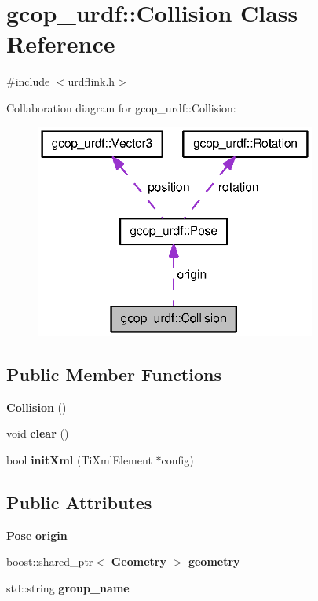 \section{gcop\-\_\-urdf\-:\-:\-Collision \-Class \-Reference}
\label{classgcop__urdf_1_1Collision}


{\ttfamily \#include $<$urdflink.\-h$>$}



\-Collaboration diagram for gcop\-\_\-urdf\-:\-:\-Collision\-:\nopagebreak
\begin{figure}[H]
\begin{center}
\leavevmode
\includegraphics[width=262pt]{classgcop__urdf_1_1Collision__coll__graph}
\end{center}
\end{figure}
\subsection*{\-Public \-Member \-Functions}
\begin{DoxyCompactItemize}
\item 
{\bf \-Collision} ()
\item 
void {\bf clear} ()
\item 
bool {\bf init\-Xml} (\-Ti\-Xml\-Element $\ast$config)
\end{DoxyCompactItemize}
\subsection*{\-Public \-Attributes}
\begin{DoxyCompactItemize}
\item 
{\bf \-Pose} {\bf origin}
\item 
boost\-::shared\-\_\-ptr$<$ {\bf \-Geometry} $>$ {\bf geometry}
\item 
std\-::string {\bf group\-\_\-name}
\end{DoxyCompactItemize}


